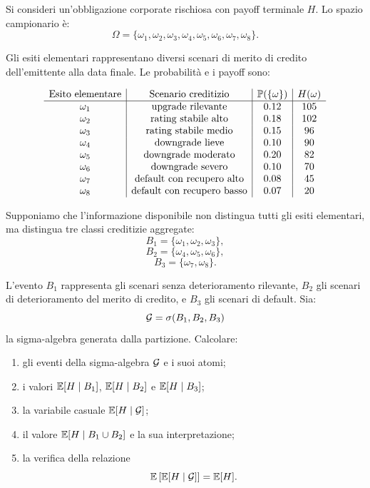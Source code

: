 \begin{exercise}
\label{ex:cap3-obbligazione-corporate-credito}
\par\smallskip

Si consideri un'obbligazione corporate rischiosa con payoff terminale $H$.
Lo spazio campionario \`{e}:
\[
\Omega
=
\{\omega_1,\omega_2,\omega_3,\omega_4,\omega_5,\omega_6,\omega_7,\omega_8\}.
\]

Gli esiti elementari rappresentano diversi scenari di merito di credito
dell'emittente alla data finale. Le probabilit\`{a} e i payoff sono:

\[
\begin{array}{c|c|c|c}
\text{Esito elementare} & \text{Scenario creditizio} &
\mathbb{P}(\{\omega\}) & H(\omega) \\
\hline
\omega_1 & \text{upgrade rilevante}        & 0.12 & 105 \\
\omega_2 & \text{rating stabile alto}      & 0.18 & 102 \\
\omega_3 & \text{rating stabile medio}     & 0.15 & 96 \\
\omega_4 & \text{downgrade lieve}          & 0.10 & 90 \\
\omega_5 & \text{downgrade moderato}       & 0.20 & 82 \\
\omega_6 & \text{downgrade severo}         & 0.10 & 70 \\
\omega_7 & \text{default con recupero alto} & 0.08 & 45 \\
\omega_8 & \text{default con recupero basso} & 0.07 & 20 \\
\end{array}
\]

Supponiamo che l'informazione disponibile non distingua tutti gli esiti
elementari, ma distingua tre classi creditizie aggregate:
\[
B_1=\{\omega_1,\omega_2,\omega_3\},
\]
\[
B_2=\{\omega_4,\omega_5,\omega_6\},
\]
\[
B_3=\{\omega_7,\omega_8\}.
\]

L'evento $B_1$ rappresenta gli scenari senza deterioramento rilevante,
$B_2$ gli scenari di deterioramento del merito di credito, e $B_3$ gli scenari
di default. Sia:
\[
\mathcal{G}
=
\sigma(B_1,B_2,B_3)
\]
la sigma-algebra generata dalla partizione. Calcolare:

\begin{enumerate}
    \item gli eventi della sigma-algebra $\mathcal{G}$ e i suoi atomi;

    \item i valori $\mathbb{E}[H\mid B_1]$, $\mathbb{E}[H\mid B_2]$ e
    $\mathbb{E}[H\mid B_3]$;

    \item la variabile casuale $\mathbb{E}[H\mid\mathcal{G}]$;

    \item il valore $\mathbb{E}[H\mid B_1\cup B_2]$ e la sua interpretazione;

    \item la verifica della relazione
    \[
    \mathbb{E}\left[
    \mathbb{E}[H\mid\mathcal{G}]
    \right]
    =
    \mathbb{E}[H].
    \]
\end{enumerate}

\medskip

\end{exercise}

